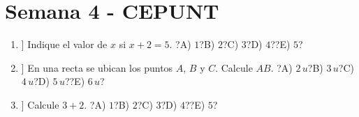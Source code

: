 
\section*{Semana 4 - CEPUNT}
\begin{enumerate}
\item[\textbf{1.}] [[Clave=A]] Indique el valor de $x$ si $x+2=5$. ?A) $1$?B) $2$?C) $3$?D) $4$??E) $5$?
\item[\textbf{2.}] [[Clave=C]] En una recta se ubican los puntos $A$, $B$ y $C$. Calcule $AB$. ?A) $2\,u$?B) $3\,u$?C) $4\,u$?D) $5\,u$??E) $6\,u$?
\item[\textbf{3.}] [[Clave=E]] Calcule $3+2$. ?A) $1$?B) $2$?C) $3$?D) $4$??E) $5$?
\end{enumerate}
